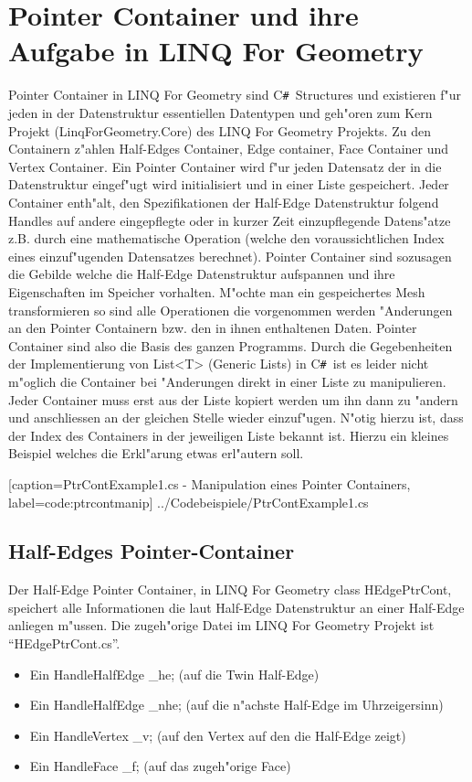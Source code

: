 \documentclass[pagesize, paper=a4, fontsize=12pt,titlepage=true, headings=small, headnosepline, abstractoff, liststotoc, nochapterprefix, plainheadsepline]{scrreprt}
\newcommand{\CSS}{C\texttt{\# }}
\newcommand{\LFG}{LINQ For Geometry}
\newcommand{\LFGS}{LINQ For Geometry }
\newcommand{\HES}{Half-Edge Datenstruktur }
\begin{document}
\section {Pointer Container und ihre Aufgabe in \LFG}
		Pointer Container in \LFGS sind \CSS Structures und existieren f"ur jeden in der Datenstruktur essentiellen Datentypen und geh"oren zum Kern Projekt (LinqForGeometry.Core) des \LFGS Projekts. Zu den Containern z"ahlen Half-Edges Container, Edge container, Face Container und Vertex Container. Ein Pointer Container wird f"ur jeden Datensatz der in die Datenstruktur eingef"ugt wird initialisiert und in einer Liste gespeichert. Jeder Container enth"alt, den Spezifikationen der \HES folgend Handles auf andere eingepflegte oder in kurzer Zeit einzupflegende Datens"atze z.B. durch eine mathematische Operation (welche den voraussichtlichen Index eines einzuf"ugenden Datensatzes berechnet). Pointer Container sind sozusagen die Gebilde welche die Half-Edge Datenstruktur aufspannen und ihre Eigenschaften im Speicher vorhalten. M"ochte man ein gespeichertes Mesh transformieren so sind alle Operationen die vorgenommen werden "Anderungen an den Pointer Containern bzw. den in ihnen enthaltenen Daten. Pointer Container sind also die Basis des ganzen Programms. Durch die Gegebenheiten der Implementierung von List<T> (Generic Lists) in \CSS ist es leider nicht m"oglich die Container bei "Anderungen direkt in einer Liste zu manipulieren. Jeder Container muss erst aus der Liste kopiert werden um ihn dann zu "andern und anschliessen an der gleichen Stelle wieder einzuf"ugen. N"otig hierzu ist, dass der Index des Containers in der jeweiligen Liste bekannt ist. Hierzu ein kleines Beispiel welches die Erkl"arung etwas erl"autern soll.

			[caption={PtrContExample1.cs - Manipulation eines Pointer Containers}, label=code:ptrcontmanip]
			{../Codebeispiele/PtrContExample1.cs}
\subsection {Half-Edges Pointer-Container}
			Der Half-Edge Pointer Container, in \LFGS class HEdgePtrCont, speichert alle Informationen die laut \HES an einer Half-Edge anliegen m"ussen. Die zugeh"orige Datei im \LFGS Projekt ist "`HEdgePtrCont.cs"'.
\begin{itemize}
\item Ein HandleHalfEdge \_he; (auf die Twin Half-Edge)
\item Ein HandleHalfEdge \_nhe; (auf die n"achste Half-Edge im Uhrzeigersinn)
\item Ein HandleVertex \_v; (auf den Vertex auf den die Half-Edge zeigt)
\item Ein HandleFace \_f; (auf das zugeh"orige Face)
\end{itemize}
\end{document}
